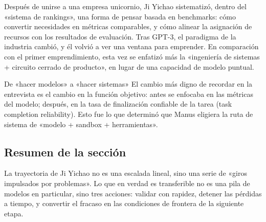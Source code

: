 Después de unirse a una empresa unicornio, Ji Yichao sistematizó, dentro del «sistema de rankings», una forma de pensar basada en benchmarks: cómo convertir necesidades en métricas comparables, y cómo alinear la asignación de recursos con los resultados de evaluación. Tras GPT-3, el paradigma de la industria cambió, y él volvió a ver una ventana para emprender. En comparación con el primer emprendimiento, esta vez se enfatizó más la «ingeniería de sistemas + circuito cerrado de producto», en lugar de una capacidad de modelo puntual.

\begin{importantbox}{De «hacer modelos» a «hacer sistemas»}
El cambio más digno de recordar en la entrevista es el cambio en la función objetivo: antes se enfocaba en las métricas del modelo; después, en la tasa de finalización confiable de la tarea (task completion reliability). Esto fue lo que determinó que Manus eligiera la ruta de sistema de «modelo + sandbox + herramientas».
\end{importantbox}

\subsection{Resumen de la sección}

La trayectoria de Ji Yichao no es una escalada lineal, sino una serie de «giros impulsados por problemas». Lo que en verdad es transferible no es una pila de modelos en particular, sino tres acciones: validar con rapidez, detener las pérdidas a tiempo, y convertir el fracaso en las condiciones de frontera de la siguiente etapa.
